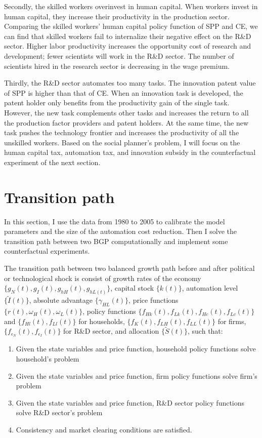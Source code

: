 \documentclass[12pt]{article}
\begin{document}
Secondly, the skilled workers overinvest in human capital. When workers invest in human capital, they increase their productivity in the production sector. Comparing the skilled workers' human capital policy function of SPP and CE, we can find that skilled workers fail to internalize their negative effect on the R\&D sector. Higher labor productivity increases the opportunity cost of research and development; fewer scientists will work in the R\&D sector. The number of scientists hired in the research sector is decreasing in the wage premium.

Thirdly, the R\&D sector automates too many tasks. The innovation patent value of SPP is higher than that of CE. When an innovation task is developed, the patent holder only benefits from the productivity gain of the single task. However, the new task complements other tasks and increases the return to all the production factor providers and patent holders. At the same time, the new task pushes the technology frontier and increases the productivity of all the unskilled workers. Based on the social planner's problem, I will focus on the human capital tax, automation tax, and innovation subsidy in the counterfactual experiment of the next section.

\section{Transition path}
In this section, I use the data from 1980 to 2005 to calibrate the model parameters and the size of the automation cost reduction. Then I solve the transition path between two BGP computationally and implement some counterfactual experiments. 

The transition path between two balanced growth path before and after political or technological shock is consist of growth rates of the economy $\{g_N(t), g_I(t), g_{hH}(t),g_{hL(t)}\}$, capital stock $\{k(t)\}$, automation level $\{\tilde{I}(t)\}$, absolute advantage $\{\gamma_{HL}(t)\}$, price functions $\{r(t), \omega_H(t), \omega_L(t)\}$, policy functions $\{f_{Hk}(t), f_{Lk}(t), f_{Hc}(t), f_{Lc}(t)\}$ and $\{f_{Hl}(t), f_{Ll}(t)\}$ for households, $\{f_{K}(t), f_{LH}(t), f_{LL}(t)\}$ for firms, $\{f_{\epsilon_N}(t), f_{\epsilon_I}(t)\}$ for R\&D sector, and allocation $\{\tilde{S}(t)\}$, such that: 
\begin{enumerate}
\item Given the state variables and price function, household policy functions solve household's problem
\item Given the state variables and price function, firm policy functions solve firm's problem
\item Given the state variables and price function, R\&D sector policy functions solve  R\&D sector's problem
\item Consistency and market clearing conditions are satisfied. 
\end{enumerate}
\end{document}
